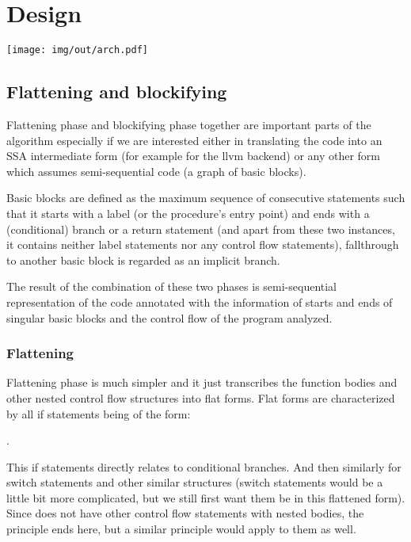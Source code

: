 

\chapter{Design}
\label{chap3}


\texttt{[image: img/out/arch.pdf]}

\section{Flattening and blockifying}

Flattening phase and blockifying phase together are important parts of the algorithm especially if we are interested either in translating the code into an SSA intermediate form (for example for the llvm backend) or any other form which assumes semi-sequential code (a graph of basic blocks).

Basic blocks are defined as the maximum sequence of consecutive statements such that it starts with a label (or the procedure's entry point) and ends with a (conditional) branch or a return statement (and apart from these two instances, it contains neither label statements nor any control flow statements), fallthrough to another basic block is regarded as an implicit branch.

The result of the combination of these two phases is semi-sequential representation of the code annotated with the information of starts and ends of singular basic blocks and the control flow of the program analyzed.

\subsection{Flattening}

Flattening phase is much simpler and it just transcribes the function bodies and other nested control flow structures into flat forms. Flat forms are characterized by all if statements being of the form:

.

This if statements directly relates to conditional branches. And then similarly for switch statements and other similar structures (switch statements would be a little bit more complicated, but we still first want them be in this flattened form). Since \cmm does not have other control flow statements with nested bodies, the principle ends here, but a similar principle would apply to them as well.

